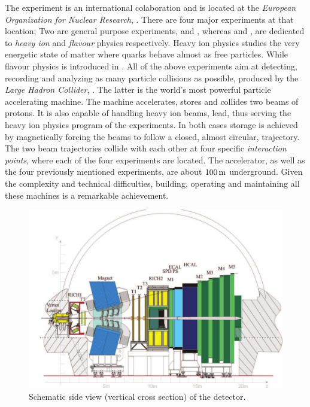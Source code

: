 
The \lhcb experiment is an international colaboration and is located at the {\it European Organization for Nuclear Research}, \cern.
There are four major experiments at that location; Two are general purpose experiments, \atlas and \cms, whereas
\alice and \lhcb, are dedicated to {\it heavy ion} and {\it flavour} physics respectively. Heavy ion physics
studies the very energetic state of matter where quarks behave almost as free particles. 
While flavour physics is introduced in . All of the above experiments aim at detecting, 
recording and analyzing as many particle collisions as possible, produced by the {\it Large Hadron Collider}, \lhc.
The latter is the world's most powerful particle accelerating machine.
The \lhc machine accelerates, stores and collides two beams of protons. It is also capable of handling
heavy ion beams, \eg lead, thus serving the heavy ion physics program of the experiments.
In both cases storage is achieved by magnetically forcing the beams to follow a closed, almost circular,
trajectory. The two beam trajectories collide with each other at four specific {\it interaction points},
where each of the four experiments are located. The \lhc accelerator, as well as the four previously
mentioned experiments, are about $100\rm \,m$ underground. Given the complexity and technical difficulties, 
building, operating and maintaining all these machines is a remarkable achievement.

\begin{figure}[t]
  \centering
  \includegraphics[width=1\textwidth]{Figures/Chapter2/detector_cross_cmyk}
  \caption{Schematic side view (vertical cross section) of the \lhcb detector.}
  \label{lhcb_detector_cross_section}
\end{figure}

